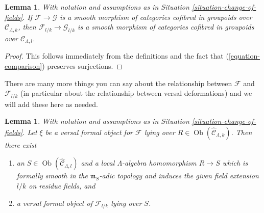 \documentclass{stacks-project}
\theoremstyle{plain}
\newtheorem{lemma}[subsection]{Lemma}
\theoremstyle{definition}
\theoremstyle{remark}
\numberwithin{equation}{subsection}
\def\Ob{\mathop{\mathrm{Ob}}\nolimits}
\begin{document}
\begin{lemma}
\label{lemma-change-of-fields-smooth}
With notation and assumptions as in Situation \ref{situation-change-of-fields}.
If $\mathcal{F} \to \mathcal{G}$ is a smooth morphism of categories cofibred
in groupoids over $\mathcal{C}_{\Lambda, k}$, then
$\mathcal{F}_{l/k} \to \mathcal{G}_{l/k}$ is a smooth morphism of categories
cofibred in groupoids over $\mathcal{C}_{\Lambda, l}$.
\end{lemma}

\begin{proof}
This follows immediately from the definitions and the fact that
(\ref{equation-comparison}) preserves surjections.
\end{proof}

\noindent
There are many more things you can say about the relationship between
$\mathcal{F}$ and $\mathcal{F}_{l/k}$ (in particular about the relationship
between versal deformations) and we will add these here as needed.

\begin{lemma}
\label{lemma-change-of-field-versal-ring}
With notation and assumptions as in Situation \ref{situation-change-of-fields}.
Let $\xi$ be a versal formal object for $\mathcal{F}$ lying over
$R \in \Ob(\widehat{\mathcal{C}}_{\Lambda, k})$. Then there exist
\begin{enumerate}
\item an $S \in \Ob(\widehat{\mathcal{C}}_{\Lambda, l})$
and a local $\Lambda$-algebra homomorphism $R \to S$ which is
formally smooth in the $\mathfrak m_S$-adic topology and induces
the given field extension $l/k$ on residue fields, and
\item a versal formal object of $\mathcal{F}_{l/k}$ lying over $S$.
\end{enumerate}
\end{lemma}
\end{document}
